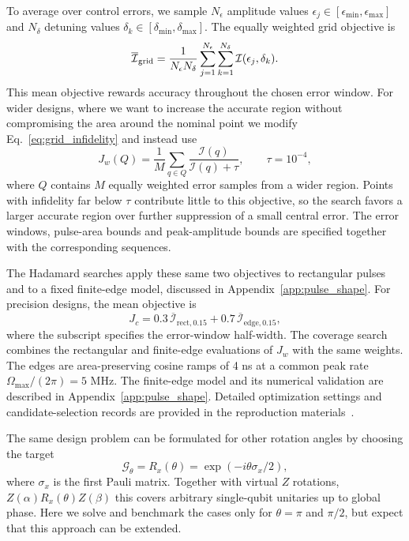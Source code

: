 \documentclass[10pt,aps,twocolumn,pra,floatfix,superscriptaddress]{revtex4-2}
\begin{document}
To average over control errors, we sample $N_\epsilon$ amplitude values $\epsilon_j\in[\epsilon_{\min},\epsilon_{\max}]$ and $N_\delta$ detuning values $\delta_k\in[\delta_{\min},\delta_{\max}]$. The equally weighted grid objective is
\begin{equation}
\overline{\mathcal I}_{\rm grid}
=\frac{1}{N_\epsilon N_\delta}
\sum_{j=1}^{N_\epsilon}\sum_{k=1}^{N_\delta}
\mathcal I(\epsilon_j,\delta_k).
\label{eq:grid_infidelity}
\end{equation}
This mean objective rewards accuracy throughout the chosen error window. For wider designs, where we want to increase the accurate region without compromising the area around the nominal point we modify Eq.~\eqref{eq:grid_infidelity} and instead use
\begin{equation}
J_w(Q)=\frac1M\sum_{q\in Q}
\frac{\mathcal I(q)}{\mathcal I(q)+\tau},
\qquad \tau=10^{-4},
\label{eq:width_loss}
\end{equation}
where $Q$ contains $M$ equally weighted error samples from a wider region. Points with infidelity far below $\tau$ contribute little to this objective, so the search favors a larger accurate region over further suppression of a small central error. The error windows, pulse-area bounds and peak-amplitude bounds are specified together with the corresponding sequences.

The Hadamard searches apply these same two objectives to rectangular pulses and to a fixed finite-edge model, discussed in Appendix~\ref{app:pulse_shape}. For precision designs, the mean objective is
\begin{equation}
J_c=0.3\,\overline{\mathcal I}_{\mathrm{rect},0.15}
+0.7\,\overline{\mathcal I}_{\mathrm{edge},0.15},
\label{eq:H_selection}
\end{equation}
where the subscript specifies the error-window half-width. The coverage search combines the rectangular and finite-edge evaluations of $J_w$ with the same weights. The edges are area-preserving cosine ramps of 4 ns at a common peak rate $\Omega_{\max}/(2\pi)=5$ MHz. 
The finite-edge model and its numerical validation are
described in Appendix~\ref{app:pulse_shape}. Detailed
optimization settings and candidate-selection records
are provided in the reproduction
materials~\cite{my_github_repo}.

The same design problem can be formulated for other rotation angles by choosing the target
\begin{equation}
\mathcal{G}_\theta=R_x(\theta)=\exp(-i\theta\sigma_x/2),
\label{eq:general_target}
\end{equation}
where $\sigma_x$ is the first Pauli matrix.
Together with virtual $Z$ rotations, $Z(\alpha)R_x(\theta)Z(\beta)$ this covers arbitrary single-qubit unitaries up to global phase. Here we solve and benchmark the cases only for $\theta=\pi$ and $\pi/2$, but expect that this approach can be extended.
\end{document}
